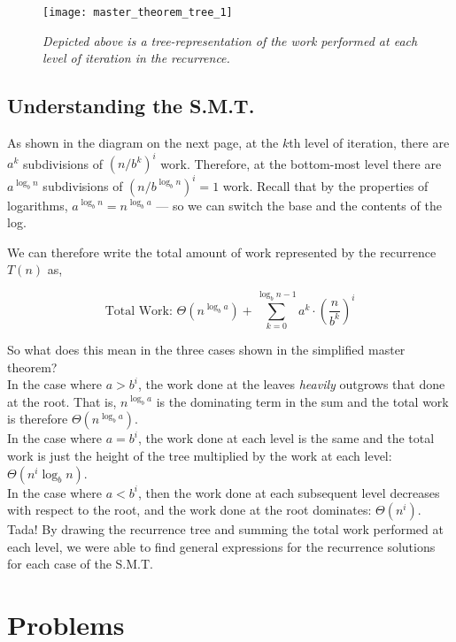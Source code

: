 \begin{figure}[ht]
    \centering
    \texttt{[image: master\_theorem\_tree\_1]}
    \caption*{\textit{Depicted above is a tree-representation of the work performed at each level of iteration in the recurrence.}}
\end{figure}

\subsection*{Understanding the S.M.T.}

As shown in the diagram on the next page, at the $k$th level of iteration, there are $a^k$ subdivisions of $(n/b^k)^i$ work. Therefore, at the bottom-most level there are $a^{\log_b n}$ subdivisions of $(n/b^{\log_b n})^i = 1$ work. Recall that by the properties of logarithms, $a^{\log_b n} = n^{\log_b a}$ --- so we can switch the base and the contents of the log.

We can therefore write the total amount of work represented by the recurrence $T(n)$ as,

$$\text{Total Work: }\Theta(n^{\log_b a}) + \sum_{k=0}^{\log_b{n-1}} a^k\cdot (\frac{n}{b^k})^i$$

So what does this mean in the three cases shown in the simplified master theorem?\\

In the case where $a > b^i$, the work done at the leaves \textit{heavily} outgrows that done at the root. That is, $n^{\log_b a}$ is the dominating term in the sum and the total work is therefore $\Theta(n^{\log_b a})$.\\

In the case where $a = b^i$, the work done at each level is the same and the total work is just the height of the tree multiplied by the work at each level: $\Theta(n^i \log_b n)$.\\

In the case where $a < b^i$, then the work done at each subsequent level decreases with respect to the root, and the work done at the root dominates: $\Theta(n^i)$.\\

Tada! By drawing the recurrence tree and summing the total work performed at each level, we were able to find general expressions for the recurrence solutions for each case of the S.M.T.
\section*{Problems}



